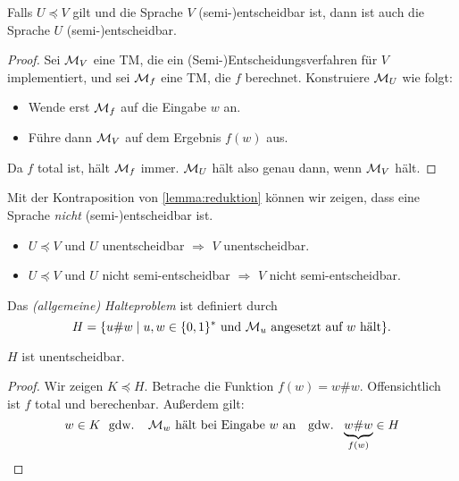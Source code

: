\begin{lemma}[name={[Reduktion]}]\label{lemma:reduktion}
  Falls $U \preceq V$ gilt und die Sprache $V$ \mbox{(semi-)entscheidbar} ist, dann ist auch die Sprache $U$
  \mbox{(semi-)entscheidbar}.
\end{lemma}


\begin{proof}
  Sei $\mathcal{M}_V$ eine \ac{TM}, die ein (Semi-)Entscheidungsverfahren für $V$ implementiert,
  und sei $\mathcal{M}_f$ eine \ac{TM}, die $f$ berechnet.
  Konstruiere $\mathcal{M}_U$ wie folgt:
  \begin{itemize}
  \item Wende erst $\mathcal{M}_f$ auf die Eingabe $w$ an.
  \item Führe dann $\mathcal{M}_V$ auf dem Ergebnis $f(w)$ aus.
  \end{itemize}
  Da $f$ total ist, hält $\mathcal{M}_f$ immer.
  $\mathcal{M}_U$ hält also genau dann, wenn $\mathcal{M}_V$ hält.
\end{proof}


\begin{Bemerkung} Mit der Kontraposition von \autoref{lemma:reduktion} können wir zeigen, dass eine Sprache \emph{nicht} \mbox{(semi-)entscheidbar} ist.
\begin{itemize}
 \item $U \preceq V$ und $U$ unentscheidbar $\Rightarrow$ $V$ unentscheidbar.
 \item $U \preceq V$ und $U$ nicht semi-entscheidbar $\Rightarrow$ $V$ nicht semi-entscheidbar.
 \qedhere
\end{itemize}
\end{Bemerkung}


\begin{Def}[name={[Halteproblem]}]
	Das \emph{(allgemeine) Halteproblem} ist definiert durch
	\[H = \{u\# w \mid u,w\in\{0,1\}^* \text{ und } \mathcal{M}_u \text{ angesetzt auf } w \text{ hält}\}. \qedhere\]
\end{Def}


\begin{Satz}[name={[$H$ ist unentscheidbar]}]\label{satz:H ist unentscheidbar}
	$H$ ist unentscheidbar.
\end{Satz}


\begin{proof}
	Wir zeigen $K \preceq H$. Betrache die Funktion $f(w)=w\# w$. Offensichtlich ist $f$ total und berechenbar.
	Außerdem gilt:
	\[
	w \in K \text{\ \ gdw. \ \ $\mathcal{M}_w$ hält bei Eingabe $w$ an \ \ gdw.\ \ } \underbrace{w\#w}_{f(w)} \in H \qedhere
	\]
\end{proof}


